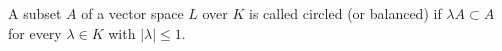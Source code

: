 A subset $A$ of a vector space $L$ over $K$ is called circled (or balanced) if $\lambda A \subset A$ for every $\lambda \in K$ with $|\lambda| \leq 1$.
